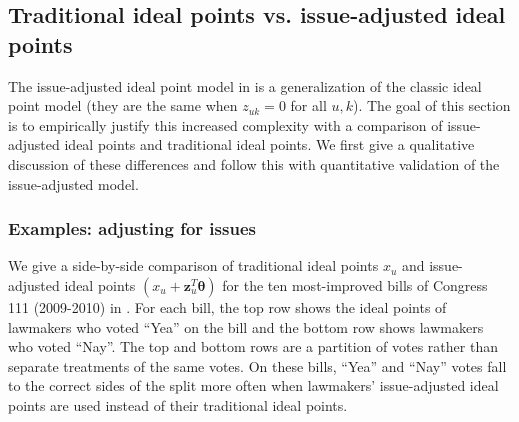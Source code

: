 \subsection*{Traditional ideal points vs. issue-adjusted ideal points}

\label{sec:jackman_vs_exploratory}
The issue-adjusted ideal point model in
 is a generalization of the
classic ideal point model (they are the same when $z_{uk}=0$ for all
$u,k$). The goal of this section is to empirically justify this
increased complexity with a comparison of issue-adjusted ideal points
and traditional ideal points.  We first give a qualitative discussion
of these differences and follow this with quantitative validation of
the issue-adjusted model.

\subsubsection{Examples: adjusting for issues}
We give a side-by-side comparison of traditional ideal points $x_u$
and issue-adjusted ideal points $(x_u + \bm z_u^T \bm \theta)$ for the
ten most-improved bills of Congress 111 (2009-2010) in
.  For each bill, the top row shows the
ideal points of lawmakers who voted ``Yea'' on the bill and the bottom
row shows lawmakers who voted ``Nay''.  The top and bottom rows are a
partition of votes rather than separate treatments of the same votes.
On these bills, ``Yea'' and ``Nay'' votes fall to the correct sides of
the split more often when lawmakers' issue-adjusted ideal points are
used instead of their traditional ideal points.


